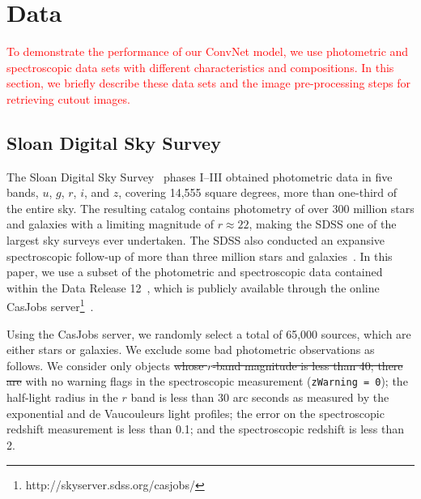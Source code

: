 \documentclass[fleqn,usenatbib]{mnras}
\newcommand{\added}[1]{\textcolor{red}{#1}}
\begin{document}
\section{Data}
  \label{sec:data}

\added{
To demonstrate the performance of our ConvNet model, we use photometric and
spectroscopic data sets with different characteristics and compositions.
In this section, we briefly describe these data sets and the image pre-processing
steps for retrieving cutout images.
}

\subsection{Sloan Digital Sky Survey}
  \label{sec:sdss}



The Sloan Digital Sky Survey~\citep[SDSS;][]{york2000sloan}
phases I--III obtained photometric data in five bands,
$u$, $g$, $r$, $i$, and $z$,
covering 14,555 square degrees, more than one-third of the entire sky.
The resulting catalog contains photometry of over 300 million stars and galaxies
with a limiting magnitude of $r \approx 22$,
making the SDSS one of the largest sky surveys ever undertaken.
The SDSS also conducted an expansive spectroscopic follow-up of
more than three million stars and galaxies~\citep{eisenstein2011sdss}.
In this paper, we use a subset of the photometric and spectroscopic data
contained within the Data Release 12~\citep[DR12;][]{alam2015eleventh},
which is publicly available through the online CasJobs
server\footnote{http://skyserver.sdss.org/casjobs/}~\citep{li2008casjobs}.

Using the CasJobs server, we randomly select a total of 65,000 sources, which are either stars or galaxies.
We exclude some bad photometric observations as follows.
We consider only objects
\sout{
whose $r$-band magnitude is less than 40; there are
}
with no warning flags in the spectroscopic measurement (\texttt{zWarning = 0});
the half-light radius in the $r$ band is less than 30 arc seconds
as measured by the exponential and de Vaucouleurs light profiles;
the error on the spectroscopic redshift measurement is less than 0.1; and
the spectroscopic redshift is less than 2.
\end{document}

